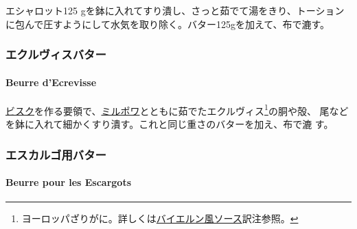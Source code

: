 \begin{recette}
エシャロット125
gを鉢に入れてすり潰し、さっと茹でて湯をきり、トーションに包んで圧すようにして水気を取り除く。バター125gを加えて、布で漉す。

\maeaki

\hypertarget{ux30a8ux30afux30ebux30f4ux30a3ux30b9ux30d0ux30bfux30fc}{%
\subsubsection{エクルヴィスバター}\label{ux30a8ux30afux30ebux30f4ux30a3ux30b9ux30d0ux30bfux30fc}}

\hypertarget{beurre-d-ecrevisse}{%
\paragraph{Beurre d'Ecrevisse}\label{beurre-d-ecrevisse}}


\protect\hyperlink{}{ビスク}を作る要領で、\protect\hyperlink{mirepoix}{ミルポワ}とともに茹でたエクルヴィス\footnote{ヨーロッパざりがに。詳しくは\protect\hyperlink{sauce-bavaroise}{バイエルン風ソース}訳注参照。}の胴や殻、
尾などを鉢に入れて細かくすり潰す。これと同じ重さのバターを加え、布で漉
す。

\maeaki

\hypertarget{ux30a8ux30b9ux30abux30ebux30b4ux7528ux30d0ux30bfux30fc}{%
\subsubsection{エスカルゴ用バター}\label{ux30a8ux30b9ux30abux30ebux30b4ux7528ux30d0ux30bfux30fc}}

\hypertarget{beurre-pour-les-escargots}{%
\paragraph{Beurre pour les Escargots}\label{beurre-pour-les-escargots}}



\end{recette}
